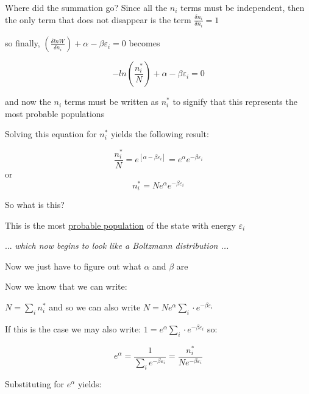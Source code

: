 \documentclass[a4paper,12pt,titlepage]{article}
\begin{document}
\begin{frame}[allowframebreaks]
Where did the summation go?  Since all the \(n_i\) terms must be independent, then the only term that does not disappear is the term \(\frac{\delta n_i}{\delta n_i}  = 1\)\par\medskip

so finally, \(\left(\frac{\delta lnW}{\delta n_i}\right) + \alpha - \beta \varepsilon_i = 0\) becomes\par
\[-ln\left(\frac{n_i^*}{N}\right) + \alpha - \beta \varepsilon_i = 0\]

and now the \(n_i\) terms must be written as \(n_i^*\) to signify that this represents the most probable populations\par\medskip

Solving this equation for \(n_i^*\) yields the following result:\par\medskip
\[\frac{n_i^*}{N} = e^{[\alpha - \beta \varepsilon_i]} = e^\alpha e^{-\beta\varepsilon_i}\]
or
\[n^*_i = N e^\alpha e^{-\beta\varepsilon_i}\]

So what is this?\par
This is the most \underline{probable population} of the state with energy \(\varepsilon_i\)\par
... \textit{which now begins to look like a Boltzmann distribution ...}\par\medskip
Now we just have to figure out what \(\alpha\) and \(\beta\) are\par\medskip

Now we know that we can write:\par\medskip

\(N=\sum_i n_i^*\) and so we can also write \(N=Ne^{\alpha}\sum_i \cdot e^{-\beta \varepsilon_i}\)\par\medskip

If this is the case we may also write: \(1 = e^{\alpha}\sum_i \cdot e^{-\beta \varepsilon_i}\) so:\par\medskip

\[e^\alpha = \frac{1}{\sum_i e^{-\beta \varepsilon_i}} = \frac{n_i^*}{Ne^{-\beta\varepsilon_i}}\]\par\medskip

Substituting for \(e^\alpha\) yields:\par
\begin{center}
\setlength{\fboxrule}{5pt}
\end{center}
\end{frame}
\end{document}
